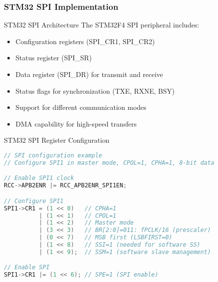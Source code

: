 \subsubsection{STM32 SPI Implementation}

\begin{concept}{STM32 SPI Architecture}
The STM32F4 SPI peripheral includes:
\begin{itemize}
    \item Configuration registers (SPI\_CR1, SPI\_CR2)
    \item Status register (SPI\_SR)
    \item Data register (SPI\_DR) for transmit and receive
    \item Status flags for synchronization (TXE, RXNE, BSY)
    \item Support for different communication modes
    \item DMA capability for high-speed transfers
\end{itemize}
\end{concept}

\begin{code}{STM32 SPI Register Configuration}
\begin{lstlisting}[language=C, style=basesmol]
// SPI configuration example
// Configure SPI1 in master mode, CPOL=1, CPHA=1, 8-bit data

// Enable SPI1 clock
RCC->APB2ENR |= RCC_APB2ENR_SPI1EN;

// Configure SPI1
SPI1->CR1 = (1 << 0)   // CPHA=1
          | (1 << 1)   // CPOL=1
          | (1 << 2)   // Master mode
          | (3 << 3)   // BR[2:0]=011: fPCLK/16 (prescaler)
          | (0 << 7)   // MSB first (LSBFIRST=0)
          | (1 << 8)   // SSI=1 (needed for software SS)
          | (1 << 9);  // SSM=1 (software slave management)

// Enable SPI
SPI1->CR1 |= (1 << 6); // SPE=1 (SPI enable)
\end{lstlisting}
\end{code}

